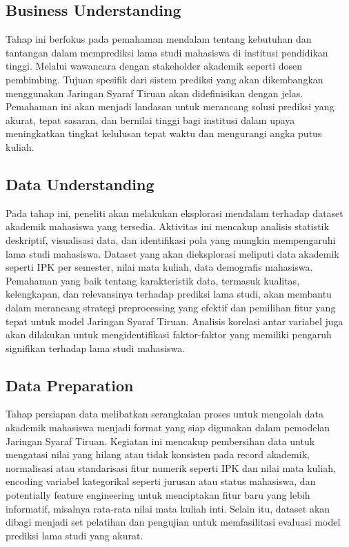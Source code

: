 \subsection{Business Understanding}
Tahap ini berfokus pada pemahaman mendalam tentang kebutuhan dan tantangan dalam memprediksi lama studi mahasiswa di institusi pendidikan tinggi. Melalui wawancara dengan stakeholder akademik seperti dosen pembimbing. Tujuan spesifik dari sistem prediksi yang akan dikembangkan menggunakan Jaringan Syaraf Tiruan akan didefinisikan dengan jelas. Pemahaman ini akan menjadi landasan untuk merancang solusi prediksi yang akurat, tepat sasaran, dan bernilai tinggi bagi institusi dalam upaya meningkatkan tingkat kelulusan tepat waktu dan mengurangi angka putus kuliah.

\subsection{Data Understanding}
Pada tahap ini, peneliti akan melakukan eksplorasi mendalam terhadap dataset akademik mahasiswa yang tersedia. Aktivitas ini mencakup analisis statistik deskriptif, visualisasi data, dan identifikasi pola yang mungkin mempengaruhi lama studi mahasiswa. Dataset yang akan dieksplorasi meliputi data akademik seperti IPK per semester, nilai mata kuliah, data demografis mahasiswa. Pemahaman yang baik tentang karakteristik data, termasuk kualitas, kelengkapan, dan relevansinya terhadap prediksi lama studi, akan membantu dalam merancang strategi preprocessing yang efektif dan pemilihan fitur yang tepat untuk model Jaringan Syaraf Tiruan. Analisis korelasi antar variabel juga akan dilakukan untuk mengidentifikasi faktor-faktor yang memiliki pengaruh signifikan terhadap lama studi mahasiswa.

\subsection{Data Preparation}
Tahap persiapan data melibatkan serangkaian proses untuk mengolah data akademik mahasiswa menjadi format yang siap digunakan dalam pemodelan Jaringan Syaraf Tiruan. Kegiatan ini mencakup pembersihan data untuk mengatasi nilai yang hilang atau tidak konsisten pada record akademik, normalisasi atau standarisasi fitur numerik seperti IPK dan nilai mata kuliah, encoding variabel kategorikal seperti jurusan atau status mahasiswa, dan potentially feature engineering untuk menciptakan fitur baru yang lebih informatif, misalnya rata-rata nilai mata kuliah inti. Selain itu, dataset akan dibagi menjadi set pelatihan dan pengujian untuk memfasilitasi evaluasi model prediksi lama studi yang akurat.

